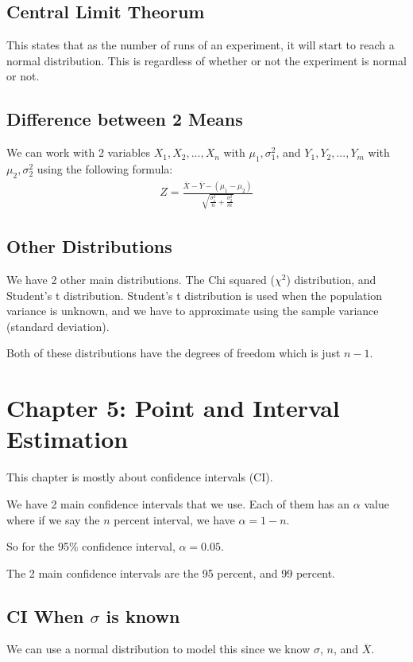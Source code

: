 \documentclass[12pt,letterpaper]{article} \usepackage{amsmath} \usepackage{graphicx} \usepackage[margin=1in]{geometry} \usepackage{longtable}  \usepackage{amssymb}
\begin{document}
	\subsection{Central Limit Theorum}
	This states that as the number of runs of an experiment, it will start to reach a normal distribution. This is regardless of whether or not the experiment is normal or not. 
	
	\subsection{Difference between 2 Means}
	We can work with 2 variables $X_1, X_2, ..., X_n$ with $\mu_1, \sigma^2_1$, and $Y_1, Y_2, ..., Y_m$ with $\mu_2, \sigma_2^2$ using the following formula:
	\begin{align*}
		Z = \frac{\overline X - \overline Y - (\mu_1 - \mu_2)}{\sqrt{\frac{\sigma_1^2}{n}+\frac{\sigma^2_2}{m}}}
	\end{align*}

	\subsection{Other Distributions}
	We have 2 other main distributions. The Chi squared ($\chi^2$) distribution, and Student's t distribution. Student's t distribution is used when the population variance is unknown, and we have to approximate using the sample variance (standard deviation). 
	
	Both of these distributions have the degrees of freedom which is just $n-1$. 
	
	\section{Chapter 5: Point and Interval Estimation} 
	This chapter is mostly about confidence intervals (CI). 
	
	We have 2 main confidence intervals that we use. Each of them has an $\alpha$ value where if we say the $n$ percent interval, we have $\alpha = 1-n$.
	
	So for the 95\% confidence interval, $\alpha = 0.05$. 
	
	The 2 main confidence intervals are the 95 percent, and 99 percent. 
	
	\subsection{CI When $\sigma$ is known}
	We can use a normal distribution to model this since we know $\sigma$, $n$, and $\overline X$. 
	
\end{document}
